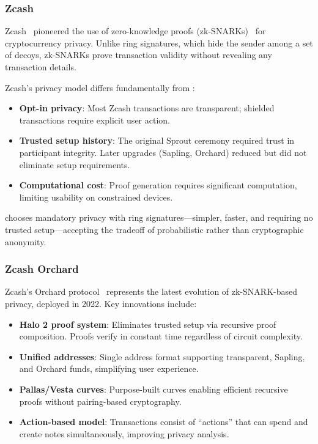 \subsubsection{Zcash}

Zcash~\cite{zcash} pioneered the use of zero-knowledge proofs
(zk-SNARKs)~\cite{zksnark} for cryptocurrency privacy. Unlike ring
signatures, which hide the sender among a set of decoys, zk-SNARKs
prove transaction validity without revealing any transaction details.

Zcash's privacy model differs fundamentally from \Botho:
\begin{itemize}
  \item \textbf{Opt-in privacy}: Most Zcash transactions are transparent;
    shielded transactions require explicit user action.
  \item \textbf{Trusted setup history}: The original Sprout ceremony
    required trust in participant integrity. Later upgrades (Sapling,
    Orchard) reduced but did not eliminate setup requirements.
  \item \textbf{Computational cost}: Proof generation requires significant
    computation, limiting usability on constrained devices.
\end{itemize}

\Botho chooses mandatory privacy with ring signatures---simpler, faster,
and requiring no trusted setup---accepting the tradeoff of probabilistic
rather than cryptographic anonymity.

\subsubsection{Zcash Orchard}

Zcash's Orchard protocol~\cite{orchard} represents the latest evolution of
zk-SNARK-based privacy, deployed in 2022. Key innovations include:

\begin{itemize}
  \item \textbf{Halo 2 proof system}: Eliminates trusted setup via recursive
    proof composition. Proofs verify in constant time regardless of circuit
    complexity.
  \item \textbf{Unified addresses}: Single address format supporting
    transparent, Sapling, and Orchard funds, simplifying user experience.
  \item \textbf{Pallas/Vesta curves}: Purpose-built curves enabling efficient
    recursive proofs without pairing-based cryptography.
  \item \textbf{Action-based model}: Transactions consist of ``actions'' that
    can spend and create notes simultaneously, improving privacy analysis.
\end{itemize}

